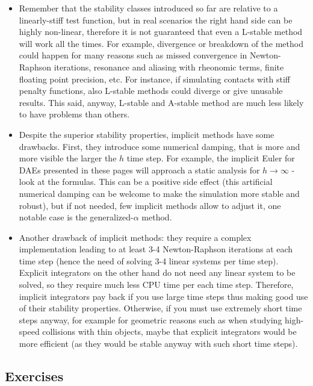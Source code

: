 \documentclass{digitaldynamics}
\begin{document}
\begin{itemize}
	\item
	Remember that the stability classes introduced so far are relative to a linearly-stiff test function, but in real scenarios the right hand side can be highly non-linear, therefore it is not guaranteed that even a L-stable method will work all the times. For example, divergence or breakdown of the method could happen for many reasons such as missed convergence in Newton-Raphson iterations, resonance and aliasing with rheonomic terms, finite floating point precision, etc. For instance, if simulating contacts with stiff penalty functions, also L-stable methods could diverge or give unusable results. 
	This said, anyway, L-stable and A-stable method are much less likely to have problems than others.
	
	\item
	Despite the superior stability properties, implicit methods have some drawbacks. First, they introduce some numerical damping, that is more and more visible the larger the $h$ time step. For example, the implicit Euler for DAEs presented in these pages will approach a static analysis for $h\rightarrow \infty$ - look at the formulas. This can be a positive side effect (this artificial numerical damping can be welcome to make the simulation more stable and robust), but if not needed, few implicit methods allow to adjust it, one notable case is the generalized-$\alpha$ method.
	
	\item 
	Another drawback of implicit methods: they require a complex implementation leading to at least 3-4 Newton-Raphson iterations at each time step (hence the need of solving 3-4 linear systems per time step). Explicit integrators on the other hand do not need any linear system to be solved, so they require much less CPU time per each time step. Therefore, implicit integrators pay back if you use large time steps thus making good use of their stability properties. Otherwise, if you must use extremely short time steps anyway, for example for geometric reasons such as when studying high-speed collisions with thin objects, maybe that explicit integrators would be more efficient (as they would be stable anyway with such short time steps).
	
\end{itemize}

\subsection{Exercises}
\end{document}
